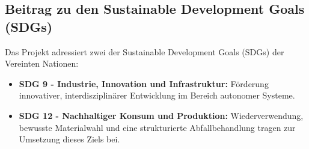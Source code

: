 \documentclass[main.tex]{subfiles} %
\begin{document}

\subsection{Beitrag zu den Sustainable Development Goals (SDGs)}

Das Projekt adressiert zwei der Sustainable Development Goals (SDGs) der Vereinten
Nationen:

\begin{itemize}
    \item \textbf{SDG 9 - Industrie, Innovation und Infrastruktur:}
    Förderung innovativer, interdisziplinärer Entwicklung im Bereich
    autonomer Systeme.

    \item \textbf{SDG 12 - Nachhaltiger Konsum und Produktion:}
    Wiederverwendung, bewusste Materialwahl und eine strukturierte Abfallbehandlung
    tragen zur Umsetzung dieses Ziels bei.
\end{itemize}
\end{document}
